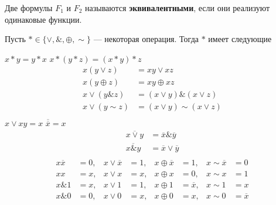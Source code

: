 \begin{df}
	Две формулы $F_1$ и $F_2$ называются {\bf эквивалентными},
	если они реализуют одинаковые функции.
\end{df}

Пусть $\ast \in \{\vee, \&, \oplus, \sim \}$ --- некоторая операция. Тогда $\ast$ имеет следующие

\begin{props}
		$x \ast y = y \ast x$
		$x \ast (y \ast z) = (x \ast y) \ast z$
		\begin{align*}
			x (y \vee z) &= xy \vee xz \\
			x (y \oplus z) &= xy \oplus xz \\
			x \vee (y  \&  z) &= (x \vee y) \& (x \vee z) \\
			x \vee (y  \sim  z) &= (x \vee y) \sim (x \vee z) \\
		\end{align*}
		$x \vee xy = x$
		$\overline{\overline{x}} = x$
		\begin{align*}
			\overline{x \vee y} &= \overline{x} \& \overline{y} \\
			\overline{x \& y} &= \overline{x} \vee \overline{y} \\ 
		\end{align*}
	\prpy{}
		\begin{align*} 
			x\overline{x} &= 0, & x \vee \overline{x} &= 1, & x \oplus \overline{x} &= 1, & x \sim \overline{x} &= 0 \\
			xx &= x, & x \vee x &= x, & x \oplus x &= 0, & x \sim x &= 1 \\
			x \& 1 &= x, & x \vee 1 &= 1, & x \oplus 1 &= \overline{x}, & x \sim 1 &= x \\
			x \& 0 &= 0, & x \vee 0 &= x, & x \oplus 0 &= x, & x \sim 0 &= \overline{x}
		\end{align*}
\end{props}
